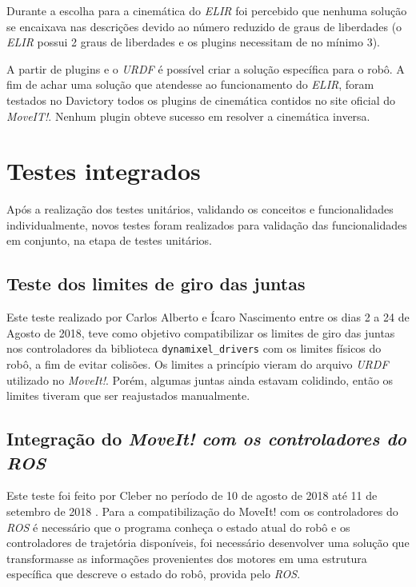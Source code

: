Durante a escolha para a cinemática do \textit{ELIR} foi percebido que nenhuma solução se encaixava nas descrições devido ao número reduzido de graus de liberdades (o \textit{ELIR} possui 2 graus de liberdades e os plugins necessitam de no mínimo 3).

A partir de plugins e o \textit{URDF} é possível criar a solução específica para o robô. A fim de achar uma solução que atendesse ao funcionamento do \textit{ELIR}, foram testados no Davictory todos os plugins de cinemática contidos no site oficial do \textit{MoveIT!}. Nenhum plugin obteve sucesso em resolver a cinemática inversa.

\section{Testes integrados}
\label{sec:testi}
Após a realização dos testes unitários, validando os conceitos e funcionalidades individualmente, novos testes foram realizados para validação das funcionalidades em conjunto, na etapa de testes unitários.

\subsection{Teste dos limites de giro das juntas}
Este teste realizado por Carlos Alberto e Ícaro Nascimento entre os dias 2 a 24 de Agosto de 2018, teve como objetivo compatibilizar os limites de giro das juntas nos controladores da biblioteca \verb|dynamixel_drivers| com os limites físicos do robô, a fim de evitar colisões. Os limites a princípio vieram do arquivo \textit{URDF} utilizado no \textit{MoveIt!}. Porém, algumas juntas ainda estavam colidindo, então os limites tiveram que ser reajustados manualmente.

\subsection{Integração do \textit{MoveIt! com os controladores do \textit{ROS}}}
Este teste foi feito por Cleber no período de 10 de agosto de 2018 até 11 de setembro de 2018 . Para a compatibilização do MoveIt! com os controladores do \textit{ROS} é necessário que o programa conheça o estado atual do robô e os controladores de trajetória disponíveis, foi necessário desenvolver uma solução que transformasse as informações provenientes dos motores em uma estrutura específica que descreve o estado do robô, provida pelo \textit{ROS}.
 
